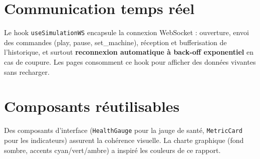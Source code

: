\section{Communication temps réel}
Le hook \texttt{useSimulationWS} encapsule la connexion WebSocket : ouverture, envoi des
commandes (play, pause, set\_machine), réception et bufferisation de l'historique, et
surtout \textbf{reconnexion automatique à back-off exponentiel} en cas de coupure. Les pages
consomment ce hook pour afficher des données vivantes sans recharger.

\section{Composants réutilisables}
Des composants d'interface (\texttt{HealthGauge} pour la jauge de santé, \texttt{MetricCard}
pour les indicateurs) assurent la cohérence visuelle. La charte graphique (fond sombre,
accents cyan/vert/ambre) a inspiré les couleurs de ce rapport.
